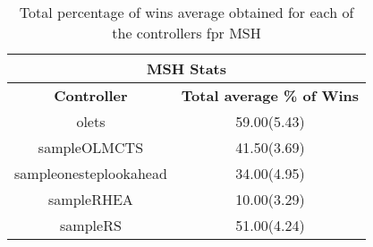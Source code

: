 \begin{table*}[!t]
\begin{center}
\begin{tabular}{|c|c|}
\hline
\multicolumn{2}{|c|}{\textbf{MSH Stats}}\\
\hline
\textbf{Controller} & \textbf{Total average \% of Wins}\\
\hline
olets & 59.00(5.43)
 \\
\hline
sampleOLMCTS & 41.50(3.69)
 \\
\hline
sampleonesteplookahead & 34.00(4.95)
 \\
\hline
sampleRHEA & 10.00(3.29)
 \\
\hline
sampleRS & 51.00(4.24)
 \\
\hline
\end{tabular}
\caption{Total percentage of wins average obtained for each of the controllers fpr MSH}
\label{table:stats_MSH}
\end{center}
\end{table*}
